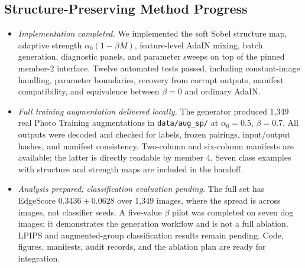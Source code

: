 \subsection{Structure-Preserving Method Progress}
\label{sec:m3_current_status}
\begin{itemize}
\item \textit{Implementation completed.} We implemented the soft Sobel structure
map, adaptive strength $\alpha_0(1-\beta M)$, feature-level AdaIN mixing, batch
generation, diagnostic panels, and parameter sweeps on top of the pinned member-2
interface. Twelve automated tests passed, including constant-image handling,
parameter boundaries, recovery from corrupt outputs, manifest compatibility,
and equivalence between $\beta=0$ and ordinary AdaIN.

\item \textit{Full training augmentation delivered locally.} The generator
produced 1,349 real Photo Training augmentations in \texttt{data/aug\_sp/} at
$\alpha_0=0.5$, $\beta=0.7$. All outputs were decoded and checked for labels,
frozen pairings, input/output hashes, and manifest consistency. Two-column and
six-column manifests are available; the latter is directly readable by member 4.
Seven class examples with structure and strength maps are included in the handoff.

\item \textit{Analysis prepared; classification evaluation pending.} The full
set has EdgeScore $0.3436\pm0.0628$ over 1,349 images, where the spread is across
images, not classifier seeds. A five-value $\beta$ pilot was completed on seven
dog images; it demonstrates the generation workflow and is not a full ablation.
LPIPS and augmented-group classification results remain pending. Code, figures,
manifests, audit records, and the ablation plan are ready for integration.
\end{itemize}

